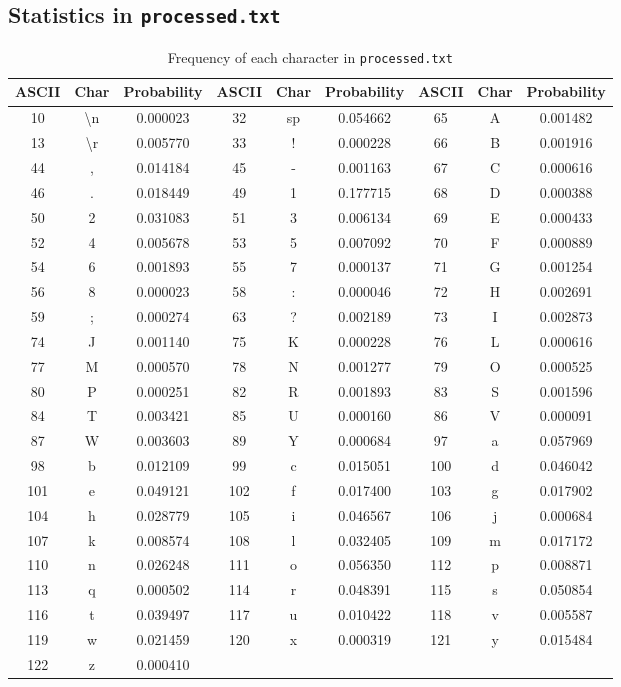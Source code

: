 \documentclass[12pt,twoside]{article}
\begin{document}
\begin{appendices}
\newpage
\subsection{Statistics in \texttt{processed.txt}}
\label{app:processedStat}

\begin{longtable}{ccc||ccc||ccc}
    \caption{Frequency of each character in \texttt{processed.txt}}
    \label{tab:processedStat} \\
    \toprule
    \textbf{ASCII} & \textbf{Char} & \textbf{Probability} & \textbf{ASCII} & \textbf{Char} & \textbf{Probability} & \textbf{ASCII} & \textbf{Char} & \textbf{Probability} \\ \hline
    \endfirsthead
    10 & \textbackslash n & 0.000023 & 32 & sp & 0.054662 & 65 & A & 0.001482 \\
    13 & \textbackslash r & 0.005770 & 33 & ! & 0.000228 & 66 & B & 0.001916 \\
    44 & , & 0.014184 & 45 & - & 0.001163 & 67 & C & 0.000616 \\
    46 & . & 0.018449 & 49 & 1 & 0.177715 & 68 & D & 0.000388 \\
    50 & 2 & 0.031083 & 51 & 3 & 0.006134 & 69 & E & 0.000433 \\
    52 & 4 & 0.005678 & 53 & 5 & 0.007092 & 70 & F & 0.000889 \\
    54 & 6 & 0.001893 & 55 & 7 & 0.000137 & 71 & G & 0.001254 \\
    56 & 8 & 0.000023 & 58 & : & 0.000046 & 72 & H & 0.002691 \\
    59 & ; & 0.000274 & 63 & ? & 0.002189 & 73 & I & 0.002873 \\
    74 & J & 0.001140 & 75 & K & 0.000228 & 76 & L & 0.000616 \\
    77 & M & 0.000570 & 78 & N & 0.001277 & 79 & O & 0.000525 \\
    80 & P & 0.000251 & 82 & R & 0.001893 & 83 & S & 0.001596 \\
    84 & T & 0.003421 & 85 & U & 0.000160 & 86 & V & 0.000091 \\
    87 & W & 0.003603 & 89 & Y & 0.000684 & 97 & a & 0.057969 \\
    98 & b & 0.012109 & 99 & c & 0.015051 & 100 & d & 0.046042 \\
    101 & e & 0.049121 & 102 & f & 0.017400 & 103 & g & 0.017902 \\
    104 & h & 0.028779 & 105 & i & 0.046567 & 106 & j & 0.000684 \\
    107 & k & 0.008574 & 108 & l & 0.032405 & 109 & m & 0.017172 \\
    110 & n & 0.026248 & 111 & o & 0.056350 & 112 & p & 0.008871 \\
    113 & q & 0.000502 & 114 & r & 0.048391 & 115 & s & 0.050854 \\
    116 & t & 0.039497 & 117 & u & 0.010422 & 118 & v & 0.005587 \\
    119 & w & 0.021459 & 120 & x & 0.000319 & 121 & y & 0.015484 \\
    122 & z & 0.000410 &  &  &  &  &  &  \\
    \bottomrule
\end{longtable}


\end{appendices}
\end{document}
